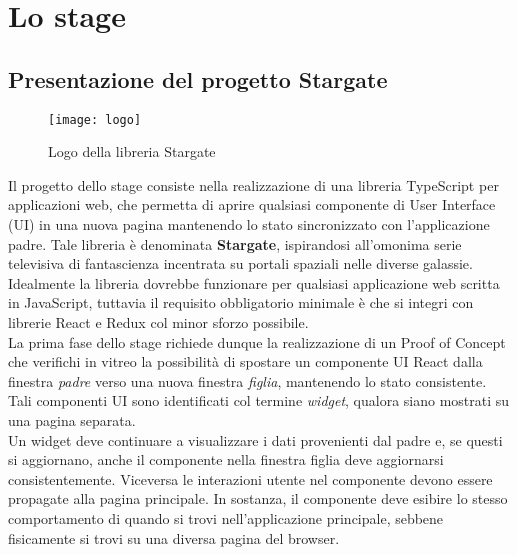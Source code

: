 
\chapter{Lo stage}
\label{cap:descrizione-stage}

\section{Presentazione del progetto Stargate}

\begin{figure}[H] 
  \centering 
  \texttt{[image: logo]} 
  \caption{Logo della libreria Stargate}
\end{figure}

Il progetto dello stage consiste nella realizzazione di una libreria \gls{TypeScript} per applicazioni web, che permetta di aprire qualsiasi componente di User Interface (UI) in una nuova pagina mantenendo lo stato sincronizzato con l'applicazione padre. Tale libreria è denominata \textbf{Stargate}, ispirandosi all'omonima serie televisiva di fantascienza incentrata su portali spaziali nelle diverse galassie. \\

Idealmente la libreria dovrebbe funzionare per qualsiasi applicazione web scritta in \gls{JavaScript}, tuttavia il requisito obbligatorio minimale è che si integri con librerie \gls{React} e \gls{Redux} col minor sforzo possibile.\\

La prima fase dello stage richiede dunque la realizzazione di un Proof of Concept che verifichi in vitreo la possibilità di spostare un componente UI React dalla finestra \textit{padre} verso una nuova finestra \textit{figlia}, mantenendo lo stato consistente. Tali componenti UI sono identificati col termine \textit{widget}, qualora siano mostrati su una pagina separata. \\

Un widget deve continuare a visualizzare i dati provenienti dal padre e, se questi si aggiornano, anche il componente nella finestra figlia deve aggiornarsi consistentemente. Viceversa le interazioni utente nel componente devono essere propagate alla pagina principale. In sostanza, il componente deve esibire lo stesso comportamento di quando si trovi nell'applicazione principale, sebbene fisicamente si trovi su una diversa pagina del browser. \\

